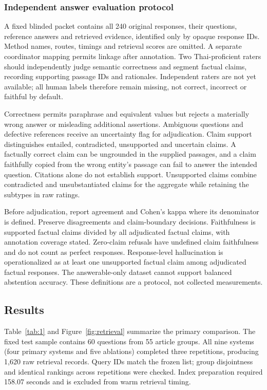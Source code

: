 \documentclass[10pt,a4paper]{article}
\begin{document}
\hypertarget{independent-answer-evaluation-protocol}{%
\subsubsection{Independent answer evaluation
protocol}\label{independent-answer-evaluation-protocol}}

A fixed blinded packet contains all 240 original responses, their
questions, reference answers and retrieved evidence, identified only by
opaque response IDs. Method names, routes, timings and retrieval scores
are omitted. A separate coordinator mapping permits linkage after
annotation. Two Thai-proficient raters should independently judge
semantic correctness and segment factual claims, recording supporting
passage IDs and rationales. Independent raters are not yet available;
all human labels therefore remain missing, not correct, incorrect or
faithful by default.

Correctness permits paraphrase and equivalent values but rejects a
materially wrong answer or misleading additional assertions. Ambiguous
questions and defective references receive an uncertainty flag for
adjudication. Claim support distinguishes entailed, contradicted,
unsupported and uncertain claims. A factually correct claim can be
ungrounded in the supplied passages, and a claim faithfully copied from
the wrong entity's passage can fail to answer the intended question.
Citations alone do not establish support. Unsupported claims combine
contradicted and unsubstantiated claims for the aggregate while
retaining the subtypes in raw ratings.

Before adjudication, report agreement and Cohen's kappa where its
denominator is defined. Preserve disagreements and claim-boundary
decisions. Faithfulness is supported factual claims divided by all
adjudicated factual claims, with annotation coverage stated. Zero-claim
refusals have undefined claim faithfulness and do not count as perfect
responses. Response-level hallucination is operationalized as at least
one unsupported factual claim among adjudicated factual responses. The
answerable-only dataset cannot support balanced abstention accuracy.
These definitions are a protocol, not collected measurements.

\hypertarget{results}{%
\subsection{Results}\label{results}}

Table~\ref{tab:1} and Figure~\ref{fig:retrieval} summarize the primary comparison. The fixed test sample contains 60 questions from 55 article groups. All
nine systems (four primary systems and five ablations) completed three
repetitions, producing 1,620 raw retrieval records. Query IDs match the
frozen list; group disjointness and identical rankings across
repetitions were checked. Index preparation required 158.07 seconds and
is excluded from warm retrieval timing.
\end{document}
